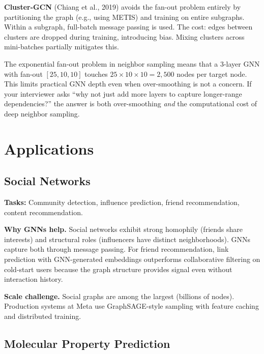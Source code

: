 \textbf{Cluster-GCN} (Chiang et al., 2019) avoids the fan-out problem entirely by partitioning the graph (e.g., using METIS) and training on entire subgraphs. Within a subgraph, full-batch message passing is used. The cost: edges between clusters are dropped during training, introducing bias. Mixing clusters across mini-batches partially mitigates this.

\begin{warningbox}
The exponential fan-out problem in neighbor sampling means that a 3-layer GNN with fan-out $[25, 10, 10]$ touches $25 \times 10 \times 10 = 2{,}500$ nodes per target node. This limits practical GNN depth even when over-smoothing is not a concern. If your interviewer asks ``why not just add more layers to capture longer-range dependencies?'' the answer is both over-smoothing \textit{and} the computational cost of deep neighbor sampling.
\end{warningbox}

\section{Applications}
\label{sec:gnn_applications}

\subsection{Social Networks}

\textbf{Tasks:} Community detection, influence prediction, friend recommendation, content recommendation.

\textbf{Why GNNs help.} Social networks exhibit strong homophily (friends share interests) and structural roles (influencers have distinct neighborhoods). GNNs capture both through message passing. For friend recommendation, link prediction with GNN-generated embeddings outperforms collaborative filtering on cold-start users because the graph structure provides signal even without interaction history.

\textbf{Scale challenge.} Social graphs are among the largest (billions of nodes). Production systems at Meta use GraphSAGE-style sampling with feature caching and distributed training.

\subsection{Molecular Property Prediction}

